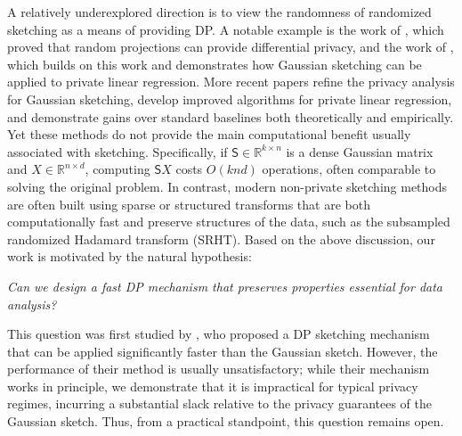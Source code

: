 \documentclass[11pt]{article}
\theoremstyle{definition}
\theoremstyle{plain}
\newcommand{\reals}{\mathbb{R}}
\begin{document}
A relatively underexplored direction is to view the randomness of randomized sketching as a means of providing DP. A notable example is the work of \citet{blocki2012johnson}, which proved that random projections can provide differential privacy, and the work of \citet{sheffet2017differentially, sheffet2019old}, which builds on this work and demonstrates how Gaussian sketching can be applied to private linear regression.
More recent papers \citep{li2025sketched, lev2025gaussianmix, lev2026near} refine the privacy analysis for Gaussian sketching, develop improved algorithms for private linear regression, and demonstrate gains over standard baselines both theoretically and empirically.
Yet these methods do not provide the main computational benefit usually associated with sketching. Specifically, if $\mathsf{S}\in\reals^{k\times n}$ is a dense Gaussian matrix and $X\in\reals^{n\times d}$, computing $\mathsf{S}X$ costs $O(knd)$ operations, often comparable to solving the original problem. In contrast, modern non-private sketching methods are often built using sparse or structured transforms that are both computationally fast and preserve structures of the data, such as the subsampled randomized Hadamard transform (SRHT).
Based on the above discussion, our work is motivated by the natural hypothesis:
\begin{center}
\emph{Can we design a fast DP mechanism that preserves properties essential for data analysis?}
\end{center}

This question was first studied by \citet{upadhyay2014randomness}, who proposed a DP sketching mechanism that can be applied significantly faster than the Gaussian sketch. However, the performance of their method is usually unsatisfactory; while their mechanism works in principle, we demonstrate that it is impractical for typical privacy regimes, incurring a substantial slack relative to the privacy guarantees of the Gaussian sketch. Thus, from a practical standpoint, this question remains open. %
\end{document}
